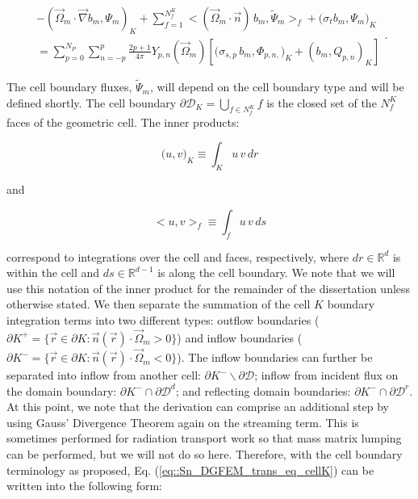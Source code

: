 \begin{equation}
\label{eq::Sn_DGFEM_trans_eq_cellK}
\begin{aligned}
- \left( \vec{\Omega}_m \cdot  \vec{\nabla} b_m, \Psi_{m} \right)_{K} + \sum_{f=1}^{N_f^K} \Big< ( \vec{\Omega}_m \cdot \vec{n} ) \, b_m, \tilde{\Psi}_m  \Big>_{f}  + \Big(  \sigma_{t} b_m ,   \Psi_{m} \Big)_{K} \\
= \sum_{p=0}^{N_P} \sum_{n=-p}^{p} \frac{2p + 1}{4 \pi}  Y_{p,n} (  \vec{\Omega}_m ) \left[ \Big( \sigma_{s,p} \, b_m,  \Phi_{p,n,} \Big)_{K}  + \left(  b_m ,   Q_{p,n} \right)_{K} \right]
\end{aligned} .
\end{equation}

\noindent The cell boundary fluxes, $\tilde{\Psi}_m$, will depend on the cell boundary type and will be defined shortly. The cell boundary $\partial \mathcal{D}_K = \bigcup_{ f \in N_f^K} f$ is the closed set of the $N_f^K$ faces of the geometric cell. The inner products:

\begin{equation}
\label{eq::Sn_spatial_inner_products_cell}
 \Big( u, v \Big)_K \equiv \int_K u \, v \, d r
\end{equation} 

\noindent and

\begin{equation}
\label{eq::Sn_spatial_inner_products_face}
 \Big< u, v \Big>_f \equiv \int_f u \, v \, d s
\end{equation}

\noindent correspond to integrations over the cell and faces, respectively, where $dr \in \mathbb{R}^d$ is within the cell and $ds \in \mathbb{R}^{d-1}$ is along the cell boundary. We note that we will use this notation of the inner product for the remainder of the dissertation unless otherwise stated. We then separate the summation of the cell $K$ boundary integration terms into two different types: outflow boundaries ($\partial K^+ = \{  \vec{r} \in \partial K: \vec{n} (\vec{r}) \cdot \vec{\Omega}_m > 0 \}$) and inflow boundaries ($\partial K^- = \{  \vec{r} \in \partial K: \vec{n} (\vec{r}) \cdot \vec{\Omega}_m < 0 \}$). The inflow boundaries can further be separated into inflow from another cell: $\partial K^- \backslash \partial \mathcal{D} $; inflow from incident flux on the domain boundary: $\partial K^- \cap \partial \mathcal{D}^d $; and reflecting domain boundaries: $\partial K^- \cap \partial \mathcal{D}^r $. At this point, we note that the derivation can comprise an additional step by using Gauss' Divergence Theorem again on the streaming term. This is sometimes performed for radiation transport work so that mass matrix lumping can be performed, but we will not do so here. Therefore, with the cell boundary terminology as proposed, Eq. (\ref{eq::Sn_DGFEM_trans_eq_cellK}) can be written into the following form:

